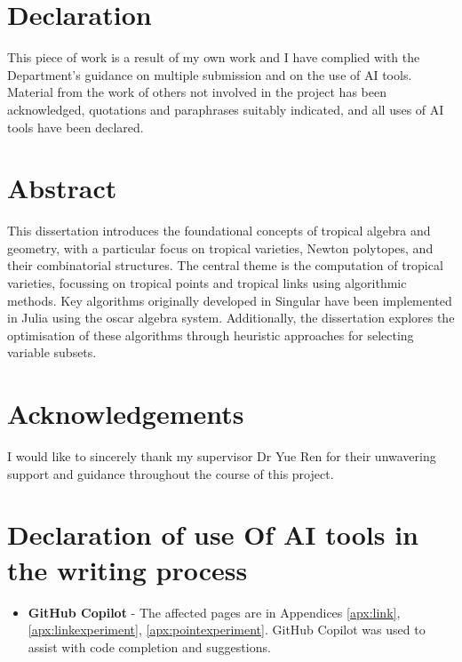 \documentclass[11pt,reqno,a4paper]{article}
\theoremstyle{theoremstyle}
\theoremstyle{examplestyle}
\theoremstyle{algorithmstyle}
\numberwithin{equation}{subsection}
\begin{document}
\newpage 
{}
\vspace*{\fill}
\begin{center}
    

\section*{Declaration}
This piece of work is a result of my own work and I have complied with the Department’s guidance on multiple submission and on the use of AI tools. Material from the work of others not involved in the project has been acknowledged, quotations and paraphrases suitably indicated, and all uses of AI tools have been declared.
\vspace{1.5cm}
\section*{Abstract}
This dissertation introduces the foundational concepts of tropical algebra and geometry, with a particular focus on tropical varieties, Newton polytopes, and their combinatorial structures. The central theme is the computation of tropical varieties, focussing on tropical points and tropical links using algorithmic methods. Key algorithms originally developed in {\sc Singular} have been implemented in Julia using the {\sc oscar} algebra system. Additionally, the dissertation explores the optimisation of these algorithms through heuristic approaches for selecting variable subsets.
\vspace{1.5cm}
\section*{Acknowledgements}
I would like to sincerely thank my supervisor Dr Yue Ren for their unwavering support and guidance throughout the course of this project.


\end{center}
\vspace*{\fill}



\newpage
\tableofcontents

\section*{Declaration of use Of AI tools in the writing process}
\begin{itemize}
    \item \textbf{GitHub Copilot} \cite{GitHub_Copilot} - The affected pages are in Appendices \ref{apx:link}, \ref{apx:linkexperiment}, \ref{apx:pointexperiment}. GitHub Copilot was used to assist with code completion and suggestions. 
\end{itemize}
\newpage
\end{document}
